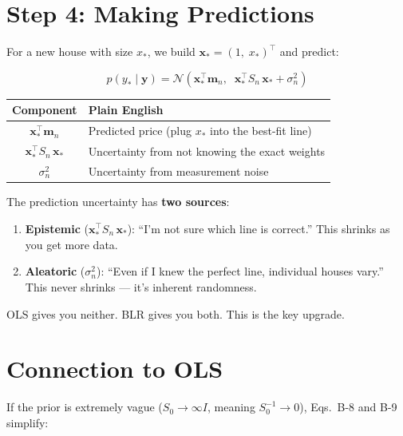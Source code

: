 \documentclass[11pt, a4paper]{article}
\newcommand{\gut}[1]{\begin{tcolorbox}[colback=lightyellow, colframe=orange!50, title=Gut feeling]#1\end{tcolorbox}}
\begin{document}
\section*{\color{secblue}Step 4: Making Predictions}

For a new house with size $x_*$, we build $\mathbf{x}_* = (1, \; x_*)^\top$ and predict:

\begin{equation}
\boxed{p(y_* \mid \mathbf{y}) = \mathcal{N}\!\left(\mathbf{x}_*^\top \mathbf{m}_n, \;\; \mathbf{x}_*^\top S_n \, \mathbf{x}_* + \sigma_n^2\right)}
\tag{B-10}
\end{equation}

\begin{center}
\begin{tabular}{cl}
\toprule
\textbf{Component} & \textbf{Plain English} \\
\midrule
$\mathbf{x}_*^\top \mathbf{m}_n$ & Predicted price (plug $x_*$ into the best-fit line) \\
$\mathbf{x}_*^\top S_n \, \mathbf{x}_*$ & Uncertainty from not knowing the exact weights \\
$\sigma_n^2$ & Uncertainty from measurement noise \\
\bottomrule
\end{tabular}
\end{center}

\gut{
The prediction uncertainty has \textbf{two sources}:
\begin{enumerate}
\item \textbf{Epistemic} ($\mathbf{x}_*^\top S_n \, \mathbf{x}_*$): ``I'm not sure which line is correct.'' This shrinks as you get more data.
\item \textbf{Aleatoric} ($\sigma_n^2$): ``Even if I knew the perfect line, individual houses vary.'' This never shrinks --- it's inherent randomness.
\end{enumerate}
OLS gives you neither. BLR gives you both. This is the key upgrade.
}


\section*{\color{secblue}Connection to OLS}

If the prior is extremely vague ($S_0 \rightarrow \infty I$, meaning $S_0^{-1} \rightarrow 0$), Eqs.~B-8 and B-9 simplify:
\end{document}

